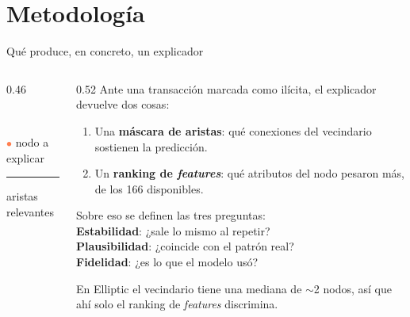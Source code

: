 \documentclass[aspectratio=169,11pt]{beamer}
\begin{document}
\section{Metodología}

\begin{frame}{Qué produce, en concreto, un explicador}
\begin{columns}[T]
\begin{column}{0.46\textwidth}
\centering
{}
\\[3pt]
{\footnotesize \textcolor{coral}{$\bullet$} nodo a explicar \quad \textcolor{amber}{\rule[2pt]{9pt}{2pt}} aristas relevantes}
\end{column}
\begin{column}{0.52\textwidth}
\footnotesize
Ante una transacción marcada como ilícita, el explicador devuelve dos cosas:
\vspace{4pt}
\begin{enumerate}
  \item Una \textbf{máscara de aristas}: qué conexiones del vecindario sostienen la predicción.
  \item Un \textbf{ranking de \textit{features}}: qué atributos del nodo pesaron más, de los 166 disponibles.
\end{enumerate}
\vspace{6pt}
\begin{block}{}
Sobre eso se definen las tres preguntas:\\[3pt]
\textbf{Estabilidad}: ¿sale lo mismo al repetir?\\
\textbf{Plausibilidad}: ¿coincide con el patrón real?\\
\textbf{Fidelidad}: ¿es lo que el modelo usó?
\end{block}
\vspace{3pt}
{\color{muted}En Elliptic el vecindario tiene una mediana de $\sim$2 nodos, así que ahí solo el ranking de \textit{features} discrimina.}
\end{column}
\end{columns}
\end{frame}
\end{document}
